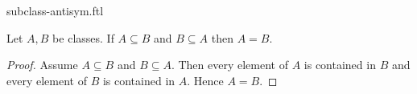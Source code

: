 \documentclass{stex}
\begin{document}
\begin{smodule}{subclass-antisym.ftl}

  \begin{forthel}
  \end{forthel}

  \begin{forthel}
    \begin{proposition}
      Let $A, B$ be classes.
      If $A \subseteq B$ and $B \subseteq A$ then $A = B$.
    \end{proposition}
    \begin{proof}
      Assume $A \subseteq B$ and $B \subseteq A$.
      Then every element of $A$ is contained in $B$ and every element of $B$ is contained in $A$.
      Hence $A = B$.
    \end{proof}
  \end{forthel}
\end{smodule}
\end{document}
